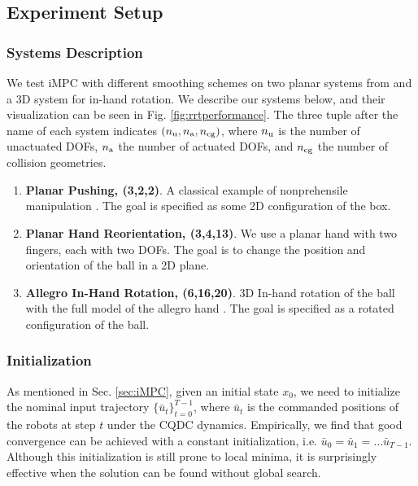 \subsection{Experiment Setup}\label{sec:trajopt_setup}
\subsubsection{Systems Description \label{sec:trajopt_setup:systems}}
We test iMPC with different smoothing schemes on two planar systems from \cite{bundledgradients} and a 3D system for in-hand rotation. We describe our systems below, and their visualization can be seen in Fig. \ref{fig:rrtperformance}. The three tuple after the name of each system indicates $(n_\mathrm{u}, n_\mathrm{a}, n_\mathrm{cg})$, where $n_\mathrm{u}$ is the number of unactuated DOFs, $n_\mathrm{a}$ the number of actuated DOFs, and $n_\mathrm{cg}$ the number of collision geometries.

\begin{enumerate}
\item {\bf Planar Pushing, (3,2,2)}.  A classical example of nonprehensile manipulation \cite{lynch1996stable}. The goal is specified as some 2D configuration of the box.
\item {\bf Planar Hand Reorientation, (3,4,13)}.  We use a planar hand with two fingers, each with two DOFs. The goal is to change the position and orientation of the ball in a 2D plane.
\item {\bf Allegro In-Hand Rotation, (6,16,20)}.  3D In-hand rotation of the ball with the full model of the allegro hand \cite{huang2020efficient}. The goal is specified as a rotated configuration of the ball.
\end{enumerate}

\subsubsection{Initialization}
As mentioned in Sec. \ref{sec:iMPC}, given an initial state $x_0$, we need to initialize the nominal input trajectory $\{\bar{u}_t\}^{T-1}_{t=0}$, where $\bar{u}_t$ is the commanded positions of the robots at step $t$ under the CQDC dynamics. Empirically, we find that good convergence can be achieved with a constant initialization, i.e. $\bar{u}_0 = \bar{u}_1 = \dots \bar{u}_{T-1}$. Although this initialization is still prone to local minima, it is surprisingly effective when the solution can be found without global search.

